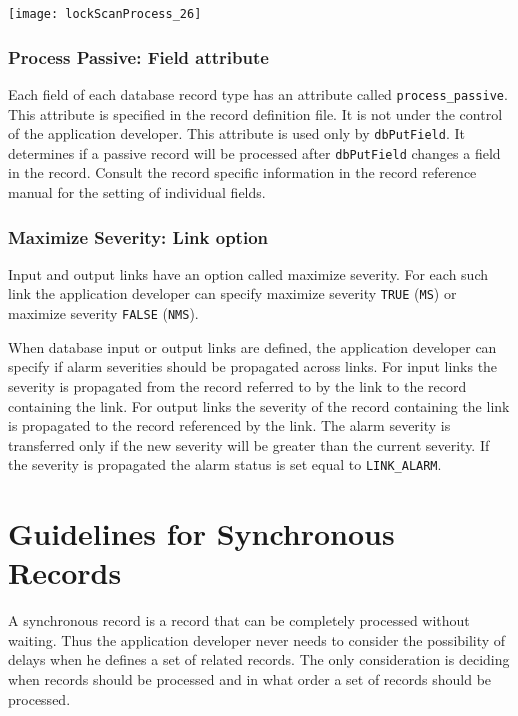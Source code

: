 \begin{center}
\texttt{[image: lockScanProcess\_26]}
\end{center}

\subsubsection{Process Passive: Field attribute }

Each field of each database record type has an attribute called \verb|process_passive|. This attribute is specified in the  
record definition file. It is not under the control of the application developer. This attribute is used only by \verb|dbPutField|. 
It determines if a passive record will be processed after \verb|dbPutField| changes a field in the record. Consult the record 
specific information in the record reference manual for the setting of individual fields.

\subsubsection{Maximize Severity: Link option}

Input and output links have an option called maximize severity. For each such link the application developer can specify 
maximize severity \verb|TRUE| (\verb|MS|) or maximize severity \verb|FALSE| (\verb|NMS|). 

When database input or output links are defined, the application developer can specify if alarm severities should be 
propagated across links. For input links the severity is propagated from the record referred to by the link to the record 
containing the link. For output links the severity of the record containing the link is propagated to the record referenced by 
the link. The alarm severity is transferred only if the new severity will be greater than the current severity. If the severity 
is propagated the alarm status is set equal to \verb|LINK_ALARM|.

\section{Guidelines for Synchronous Records}

A synchronous record is a record that can be completely processed without waiting. Thus the application developer never 
needs to consider the possibility of delays when he defines a set of related records. The only consideration is deciding 
when records should be processed and in what order a set of records should be processed.

